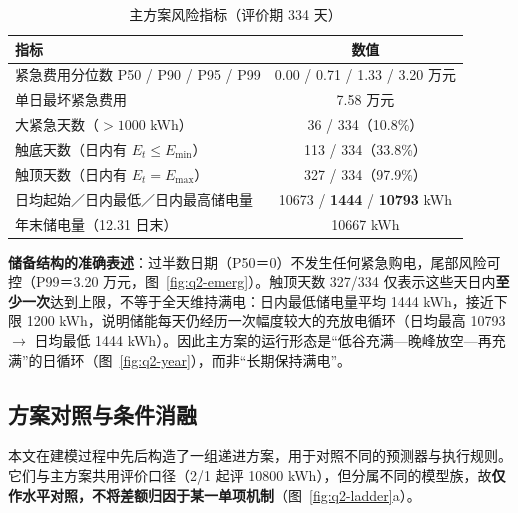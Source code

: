 \begin{table}[H]
  \centering
  \caption{主方案风险指标（评价期 334 天）}
  \label{tab:q2-risk}
  \begin{tabular}{lc}
    \toprule
    指标 & 数值 \\
    \midrule
    紧急费用分位数 P50 / P90 / P95 / P99 & 0.00 / 0.71 / 1.33 / 3.20 万元 \\
    单日最坏紧急费用 & 7.58 万元 \\
    大紧急天数（$>1000$ kWh） & 36 / 334（10.8\%） \\
    触底天数（日内有 $E_t\le E_{\min}$） & 113 / 334（33.8\%） \\
    触顶天数（日内有 $E_t=E_{\max}$） & 327 / 334（97.9\%） \\
    日均起始／日内最低／日内最高储电量 & 10673 / \textbf{1444} / \textbf{10793} kWh \\
    年末储电量（12.31 日末） & 10667 kWh \\
    \bottomrule
  \end{tabular}
\end{table}

\textbf{储备结构的准确表述}：过半数日期（P50＝0）不发生任何紧急购电，尾部风险可控（P99＝3.20 万元，图~\ref{fig:q2-emerg}）。触顶天数 327/334 仅表示这些天日内\textbf{至少一次}达到上限，不等于全天维持满电：日内最低储电量平均 1444 kWh，接近下限 1200 kWh，说明储能每天仍经历一次幅度较大的充放电循环（日均最高 10793 $\to$ 日均最低 1444 kWh）。因此主方案的运行形态是``低谷充满—晚峰放空—再充满''的日循环（图~\ref{fig:q2-year}），而非``长期保持满电''。

\subsection{方案对照与条件消融}
\label{sec:q2-ablation}

本文在建模过程中先后构造了一组递进方案，用于对照不同的预测器与执行规则。它们与主方案共用评价口径（2/1 起评 10800 kWh），但分属不同的模型族，故\textbf{仅作水平对照，不将差额归因于某一单项机制}（图~\ref{fig:q2-ladder}a）。

